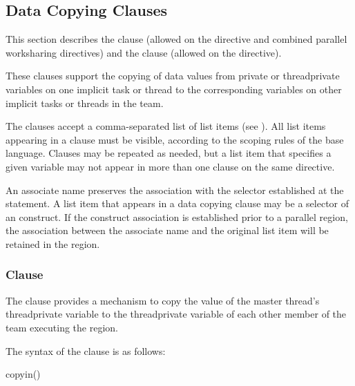 {{{{\subsection{Data Copying Clauses}
\label{subsec:Data Copying Clauses}
This section describes the  clause (allowed on the  directive and 
combined parallel worksharing directives) and the  clause (allowed on 
the  directive).

These clauses support the copying of data values from private or threadprivate variables 
on one implicit task or thread to the corresponding variables on other implicit tasks or 
threads in the team.

The clauses accept a comma-separated list of list items (see ). 
All list items appearing in a clause must be visible, according to the scoping rules of the 
base language. Clauses may be repeated as needed, but a list item that specifies a given 
variable may not appear in more than one clause on the same directive.

\fortranspecificstart
An associate name preserves the association with the selector established at the  statement. A list item that appears in a data copying clause may be a selector of an  construct. If the construct association is established prior to a parallel region, the association between the associate name and the original list item will be retained in the region.
\fortranspecificend







\subsubsection{ Clause}
\label{subsubsec:copyin clause}
\summary
The  clause provides a mechanism to copy the value of the master thread’s 
threadprivate variable to the threadprivate variable of each other member of the team 
executing the  region. 

\syntax
The syntax of the  clause is as follows:

\begin{boxedcode}
copyin()
\end{boxedcode}

}}}}

